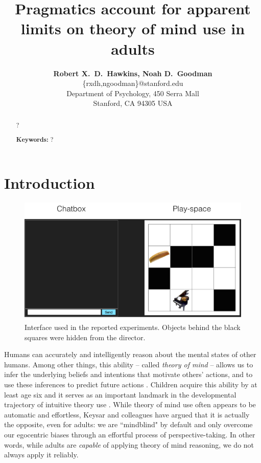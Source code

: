 \documentclass[10pt,letterpaper]{article}
\title{Pragmatics account for apparent limits on theory of mind use in adults}
\author{{\large \bf Robert X.~D.~Hawkins, Noah D.~Goodman}\\
  \{rxdh,ngoodman\}@stanford.edu\\
  Department of Psychology, 450 Serra Mall \\
  Stanford, CA 94305 USA}
\begin{document}
\maketitle

\begin{abstract}
?

\textbf{Keywords:} 
?
\end{abstract}

\section{Introduction}
\label{sec:intro}

\begin{figure}[t!]
\begin{center}
\includegraphics[scale = .35]{images/overall_view.jpg}
\end{center}
\vspace{-.25cm}
\caption{Interface used in the reported experiments. Objects behind the black squares were hidden from the director. }
\label{fig:interface}
\end{figure}

Humans can accurately and intelligently reason about the mental states of other humans. Among other things, this ability -- called \emph{theory of mind} \cite{PremackWoodruff78_ChimpanzeeToM} -- allows us to infer the underlying beliefs and intentions that motivate others' actions, and to use these inferences to predict future actions \cite{BakerSaxeTenenbaum09_ActionUnderstandingInversePlanning}. Children acquire this ability by at least age six \cite{WimmerPerner83_BeliefsAboutBeliefs, WellmanCrossWatson01_ToMMetaAnalysis} and it serves as an important landmark in the developmental trajectory of intuitive theory use \cite{GopnikWellman12_ReconstructingConstructivism}.
%
While theory of mind use often appears to be automatic and effortless, Keysar and colleagues \cite{KeysarBarr___Brauner00_TakingPerspective, KeysarLinBarr03_LimitsOnTheoryOfMindUse, LinKeysarEpley10_ReflexivelyMindblind} have argued that it is actually the opposite, even for adults: we are ``mindblind" by default and only overcome our egocentric biases through an effortful process of perspective-taking. In other words, while adults are \emph{capable} of applying theory of mind reasoning, we do not always apply it reliably. 
\end{document}
